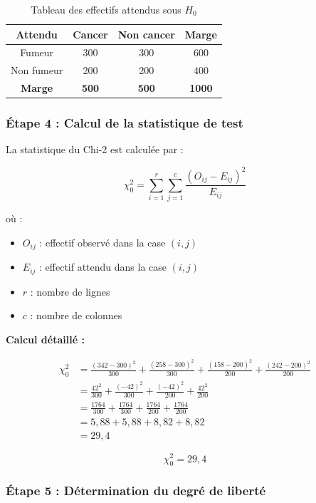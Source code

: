 \documentclass[11pt,a4paper]{article}
\begin{document}
\begin{table}[h]
\centering
\begin{tabular}{|c|c|c|c|}
\hline
\textbf{Attendu} & \textbf{Cancer} & \textbf{Non cancer} & \textbf{Marge} \\
\hline
Fumeur & 300 & 300 & 600 \\
\hline
Non fumeur & 200 & 200 & 400 \\
\hline
\textbf{Marge} & \textbf{500} & \textbf{500} & \textbf{1000} \\
\hline
\end{tabular}
\caption{Tableau des effectifs attendus sous $H_0$}
\end{table}

\subsubsection{Étape 4 : Calcul de la statistique de test}

La statistique du Chi-2 est calculée par :

$$\chi_0^2 = \sum_{i=1}^{r} \sum_{j=1}^{c} \frac{(O_{ij} - E_{ij})^2}{E_{ij}}$$

où :
\begin{itemize}
    \item $O_{ij}$ : effectif observé dans la case $(i,j)$
    \item $E_{ij}$ : effectif attendu dans la case $(i,j)$
    \item $r$ : nombre de lignes
    \item $c$ : nombre de colonnes
\end{itemize}

\textbf{Calcul détaillé :}

\begin{align*}
\chi_0^2 &= \frac{(342 - 300)^2}{300} + \frac{(258 - 300)^2}{300} + \frac{(158 - 200)^2}{200} + \frac{(242 - 200)^2}{200}\\
&= \frac{42^2}{300} + \frac{(-42)^2}{300} + \frac{(-42)^2}{200} + \frac{42^2}{200}\\
&= \frac{1764}{300} + \frac{1764}{300} + \frac{1764}{200} + \frac{1764}{200}\\
&= 5,88 + 5,88 + 8,82 + 8,82\\
&= 29,4
\end{align*}

$$\boxed{\chi_0^2 = 29,4}$$

\subsubsection{Étape 5 : Détermination du degré de liberté}
\end{document}
